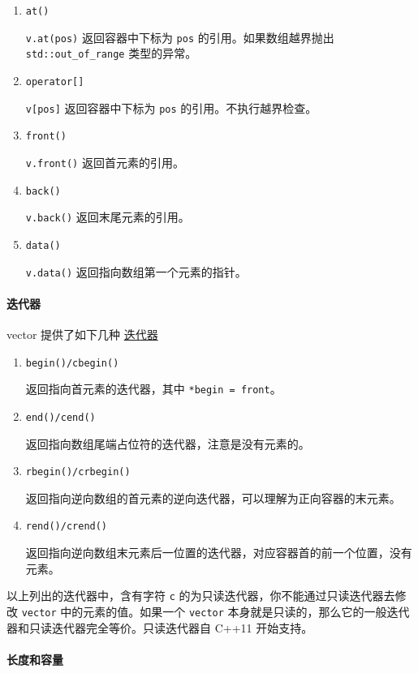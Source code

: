 \begin{enumerate}
\def\labelenumi{\arabic{enumi}.}
\item
  \texttt{at()}

  \texttt{v.at(pos)} 返回容器中下标为 \texttt{pos} 的引用。如果数组越界抛出 \texttt{std::out\_of\_range} 类型的异常。
\item
  \texttt{operator{[}{]}}

  \texttt{v{[}pos{]}} 返回容器中下标为 \texttt{pos} 的引用。不执行越界检查。
\item
  \texttt{front()}

  \texttt{v.front()} 返回首元素的引用。
\item
  \texttt{back()}

  \texttt{v.back()} 返回末尾元素的引用。
\item
  \texttt{data()}

  \texttt{v.data()} 返回指向数组第一个元素的指针。
\end{enumerate}

\paragraph{迭代器}\label{ux8fedux4ee3ux5668}

vector 提供了如下几种 \href{./iterator.md}{迭代器}

\begin{enumerate}
\def\labelenumi{\arabic{enumi}.}
\item
  \texttt{begin()/cbegin()}

  返回指向首元素的迭代器，其中 \texttt{*begin\ =\ front}。
\item
  \texttt{end()/cend()}

  返回指向数组尾端占位符的迭代器，注意是没有元素的。
\item
  \texttt{rbegin()/crbegin()}

  返回指向逆向数组的首元素的逆向迭代器，可以理解为正向容器的末元素。
\item
  \texttt{rend()/crend()}

  返回指向逆向数组末元素后一位置的迭代器，对应容器首的前一个位置，没有元素。
\end{enumerate}

以上列出的迭代器中，含有字符 \texttt{c} 的为只读迭代器，你不能通过只读迭代器去修改 \texttt{vector} 中的元素的值。如果一个 \texttt{vector} 本身就是只读的，那么它的一般迭代器和只读迭代器完全等价。只读迭代器自 C++11 开始支持。

\paragraph{长度和容量}\label{ux957fux5ea6ux548cux5bb9ux91cf}

